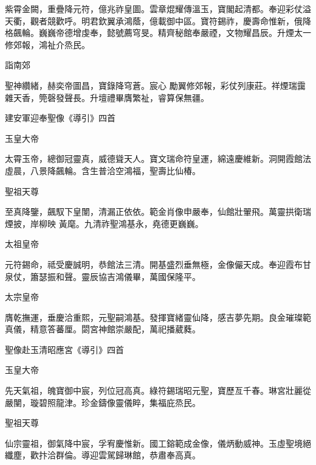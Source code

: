 \begin{pinyinscope}
 紫霄金闕，重疊降元符，億兆祚皇圖。雲章焜耀傳溫玉，寶閣起清都。奉迎彩仗溢天衢，觀者競歡呼。明君欽翼承鴻蔭，億載御中區。寶符錫祚，慶壽命惟新，俄降格飆輪。巍巍帝德增虔奉，懿號薦穹旻。精齊秘館奉嚴禋，文物耀昌辰。升煙太一修郊報，鴻祉介烝民。



 詣南郊



 聖神纘緒，赫奕帝圖昌，寶錄降穹蒼。宸心
 勵翼修郊報，彩仗列康莊。祥煙瑞靄雜天香，筦磬發聲長。升壇禮畢膺繁祉，睿算保無疆。



 建安軍迎奉聖像《導引》四首



 玉皇大帝



 太霄玉帝，總御冠靈真，威德聳天人。寶文瑞命符皇運，綿遠慶維新。洞開霞館法虛晨，八景降飆輪。含生普洽空鴻福，聖壽比仙椿。



 聖祖天尊



 至真降鑒，飆馭下皇闈，清漏正依依。範金肖像申嚴奉，仙館壯翬飛。萬靈拱衛瑞煙披，岸柳映
 黃麾。九清祚聖鴻基永，堯德更巍巍。



 太祖皇帝



 元符錫命，祗受慶誠明，恭館法三清。開基盛烈垂無極，金像儼天成。奉迎霞布甘泉仗，簫瑟振和聲。靈辰協吉鴻儀畢，萬國保隆平。



 太宗皇帝



 膺乾撫運，垂慶洽重熙，元聖嗣鴻基。發揮寶緒靈仙降，感吉夢先期。良金璀璨範真儀，精意答蕃厘。閟宮神館崇嚴配，萬祀播葳蕤。



 聖像赴玉清昭應宮《導引》四首



 玉皇大帝



 先天氣祖，魄寶御中宸，列位冠高真。綠符錫瑞昭元聖，寶歷亙千春。琳宮壯麗從嚴闉，璇碧照龍津。珍金鑄像靈儀睟，集福庇烝民。



 聖祖天尊



 仙宗靈祖，御氣降中宸，孚宥慶惟新。國工鎔範成金像，儀炳動威神。玉虛聖境絕纖塵，歡抃洽群倫。導迎雲駕歸琳館，恭肅奉高真。




\end{pinyinscope}
